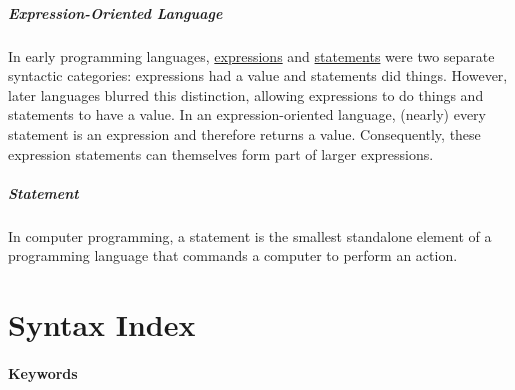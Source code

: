 \documentclass[a4paper,]{book}
\let\oldparagraph\paragraph
\renewcommand{\paragraph}[1]{\oldparagraph{#1}\mbox{}}
\begin{document}
\hypertarget{expression-oriented-language}{\paragraph{Expression-Oriented
Language}\label{expression-oriented-language}}

In early programming languages,
\protect\hyperlink{expression}{expressions} and
\protect\hyperlink{statement}{statements} were two separate syntactic
categories: expressions had a value and statements did things. However,
later languages blurred this distinction, allowing expressions to do
things and statements to have a value. In an expression-oriented
language, (nearly) every statement is an expression and therefore
returns a value. Consequently, these expression statements can
themselves form part of larger expressions.

\hypertarget{statement}{\paragraph{Statement}\label{statement}}

In computer programming, a statement is the smallest standalone element
of a programming language that commands a computer to perform an action.

\chapter{Syntax Index}\label{sec--syntax-index}

\subsubsection{Keywords}\label{keywords}
\end{document}
